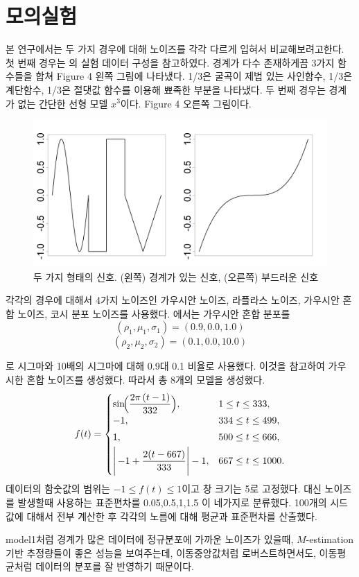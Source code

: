 \documentclass[letterpaper,12pt]{article}
\begin{document}
{\section{모의실험}\label{sec:thms}
본 연구에서는 두 가지 경우에 대해 노이즈를 각각 다르게 입혀서 비교해보려고한다. 첫 번째 경우는  \cite{verbout1998parameter}의 실험 데이터 구성을 참고하였다. 경계가 다수 존재하게끔 3가지 함수들을 합쳐 Figure 4 왼쪽 그림에 나타냈다. 1/3은 굴곡이 제법 있는 사인함수, 1/3은 계단함수, 1/3은 절댓값 함수를 이용해 뾰족한 부분을 나타냈다. 두 번째 경우는 경계가 없는 간단한 선형 모델 $x^3$이다. Figure 4 오른쪽 그림이다.
\begin{figure}[H]
    \centering
    \includegraphics[width=0.8\linewidth]{figures/Truesignal.png}
    \caption{두 가지 형태의 신호. (왼쪽) 경계가 있는 신호, (오른쪽) 부드러운 신호}
\end{figure}
각각의 경우에 대해서 4가지 노이즈인 가우시안 노이즈, 라플라스 노이즈, 가우시안 혼합 노이즈, 코시 분포 노이즈를 사용했다.  \citet{verbout1998parameter} 에서는 가우시안 혼합 분포를 
\[
(\rho_1,\mu_1,\sigma_1)=(0.9,0.0,1.0) 
\]
\[
(\rho_2,\mu_2,\sigma_2)=(0.1,0.0,10.0)
\]

로 시그마와 10배의 시그마에 대해 0.9대 0.1 비율로 사용했다.
이것을 참고하여 가우시한 혼합 노이즈를 생성했다.
따라서 총 8개의 모델을 생성했다.
\[
f(t)=
\begin{cases}
\sin\!\Bigl(\dfrac{2\pi\,(t-1)}{332}\Bigr), & 1 \le t \le 333, \\[1mm]
-1, & 334 \le t \le 499, \\[1mm]
1, & 500 \le t \le 666, \\[1mm]
\Biggl|\,-1 + \dfrac{2(t-667)}{333}\Biggr| - 1, & 667 \le t \le 1000.
\end{cases}
\]
데이터의 함숫값의 범위는 $-1\le f(t) \le 1$이고 창 크기는 5로 고정했다. 대신 노이즈를 발생할때 사용하는 표준편차를 0.05,0.5,1,1.5 이 네가지로 분류했다. 100개의 시드값에 대해서 전부 계산한 후 각각의 노름에 대해 평균과 표준편차를 산출했다.

model1처럼 경계가 많은 데이터에 정규분포에 가까운 노이즈가 있을때, $M$-estimation 기반 추정량들이 좋은 성능을 보여주는데, 이동중앙값처럼 로버스트하면서도, 이동평균처럼 데이터의 분포를 잘 반영하기 때문이다.

}
\end{document}
